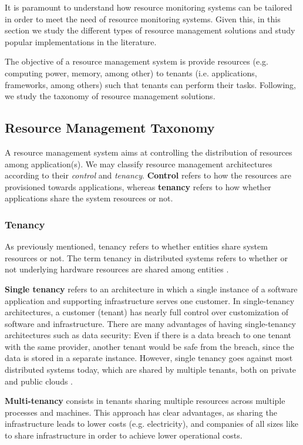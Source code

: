 

It is paramount to understand how resource monitoring systems can be tailored in order to meet the need of resource monitoring systems. Given this, in this section we study the different types of resource management solutions and study popular implementations in the literature.

The objective of a resource management system is provide resources (e.g. computing power, memory, among other) to tenants (i.e. applications, frameworks, among others) such that tenants can perform their tasks. Following, we study the taxonomy of resource management solutions.

\subsection{Resource Management Taxonomy}

A resource management system aims at controlling the distribution of resources among application(s). We may classify resource management architectures according to their \textit{control} and \textit{tenancy}. \textbf{Control} refers to how the resources are provisioned towards applications, whereas \textbf{tenancy} refers to how whether applications share the system resources or not.

\subsubsection{Tenancy}

As previously mentioned, tenancy refers to whether entities share system resources or not. The term tenancy in distributed systems refers to whether or not underlying hardware resources are shared among entities \cite{Hong2019}.

\textbf{Single tenancy} refers to an architecture in which a single instance of a software application and supporting infrastructure serves one customer. In single-tenancy architectures, a customer (tenant) has nearly full control over customization of software and infrastructure. There are many advantages of having single-tenancy architectures such as data security: Even if there is a data breach to one tenant with the same provider, another tenant would be safe from the breach, since the data is stored in a separate instance. However, single tenancy goes against most distributed systems today, which are shared by multiple tenants, both on private and public clouds \cite{mace2015retro}.

\textbf{Multi-tenancy} consists in tenants sharing multiple resources across multiple processes and machines. This approach has clear advantages, as sharing the infrastructure leads to lower costs (e.g. electricity), and companies of all sizes like to share infrastructure in order to achieve lower operational costs. 

